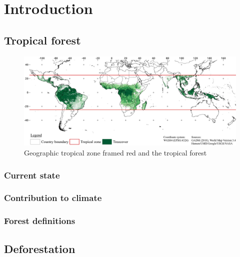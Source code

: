 \chapter{Introduction}
\label{ch:introduction}

\section{Tropical forest}
\label{sec:tropical_forest}

	\begin{figure}[ht]
		\centering
		\includegraphics[scale=0.97]{img/intro_overview_frameless}
		\caption[Tropical zone]{Geographic tropical zone framed red and the tropical forest}
		\label{fig:tropicalzone}
	\end{figure}

	\subsection{Current state}
		\lipsum[1-2]
	\subsection{Contribution to climate}
		\lipsum[1-2]
	\subsection{Forest definitions}
		\lipsum[1-3]

\section{Deforestation}
\label{sec:deforestation}

